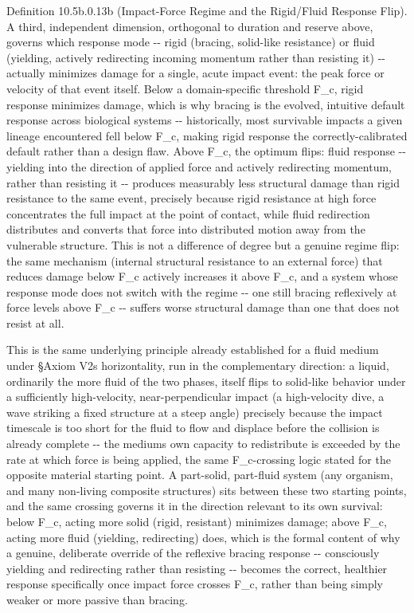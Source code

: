 \documentclass[
]{article}
\begin{document}
Definition 10.5b.0.13b (Impact-Force Regime and the Rigid/Fluid Response
Flip). A third, independent dimension, orthogonal to duration and
reserve above, governs which response mode -\/- rigid (bracing,
solid-like resistance) or fluid (yielding, actively redirecting incoming
momentum rather than resisting it) -\/- actually minimizes damage for a
single, acute impact event: the peak force or velocity of that event
itself. Below a domain-specific threshold F\_c, rigid response minimizes
damage, which is why bracing is the evolved, intuitive default response
across biological systems -\/- historically, most survivable impacts a
given lineage encountered fell below F\_c, making rigid response the
correctly-calibrated default rather than a design flaw. Above F\_c, the
optimum flips: fluid response -\/- yielding into the direction of
applied force and actively redirecting momentum, rather than resisting
it -\/- produces measurably less structural damage than rigid resistance
to the same event, precisely because rigid resistance at high force
concentrates the full impact at the point of contact, while fluid
redirection distributes and converts that force into distributed motion
away from the vulnerable structure. This is not a difference of degree
but a genuine regime flip: the same mechanism (internal structural
resistance to an external force) that reduces damage below F\_c actively
increases it above F\_c, and a system whose response mode does not
switch with the regime -\/- one still bracing reflexively at force
levels above F\_c -\/- suffers worse structural damage than one that
does not resist at all.

This is the same underlying principle already established for a fluid
medium under §Axiom V2s horizontality, run in the complementary
direction: a liquid, ordinarily the more fluid of the two phases, itself
flips to solid-like behavior under a sufficiently high-velocity,
near-perpendicular impact (a high-velocity dive, a wave striking a fixed
structure at a steep angle) precisely because the impact timescale is
too short for the fluid to flow and displace before the collision is
already complete -\/- the mediums own capacity to redistribute is
exceeded by the rate at which force is being applied, the same
F\_c-crossing logic stated for the opposite material starting point. A
part-solid, part-fluid system (any organism, and many non-living
composite structures) sits between these two starting points, and the
same crossing governs it in the direction relevant to its own survival:
below F\_c, acting more solid (rigid, resistant) minimizes damage; above
F\_c, acting more fluid (yielding, redirecting) does, which is the
formal content of why a genuine, deliberate override of the reflexive
bracing response -\/- consciously yielding and redirecting rather than
resisting -\/- becomes the correct, healthier response specifically once
impact force crosses F\_c, rather than being simply weaker or more
passive than bracing.
\end{document}
